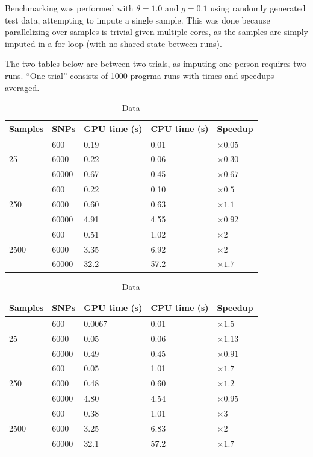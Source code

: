 \documentclass[12pt]{article}
\begin{document}
Benchmarking was performed with $\theta = 1.0$ and $g = 0.1$ using randomly
generated test data, attempting to impute a single sample. This was done
because parallelizing over samples is trivial given multiple cores, as the
samples are simply imputed in a for loop (with no shared state between runs).

The two tables below are between two trials, as imputing one
person requires two runs. ``One trial'' consists of 1000 progrma runs with
times and speedups averaged.



\begin{table}[ht]
  \caption{Data}
\begin{tabular}{l|lll|l}
Samples & SNPs  & GPU time (s) & CPU time (s) & Speedup       \\
        \hline
        & 600   & 0.19         & 0.01         & $\times 0.05$ \\
25      & 6000  & 0.22         & 0.06         & $\times 0.30$ \\
        & 60000 & 0.67         & 0.45         & $\times 0.67$ \\
        \hline
        & 600   & 0.22         & 0.10         & $\times 0.5$  \\
250     & 6000  & 0.60         & 0.63         & $\times 1.1$  \\
        & 60000 & 4.91         & 4.55         & $\times 0.92$ \\
        \hline
        & 600   & 0.51         & 1.02         & $\times 2$    \\
2500    & 6000  & 3.35         & 6.92         & $\times 2$    \\
        & 60000 & 32.2         & 57.2         & $\times 1.7$
\end{tabular}

\begin{tabular}{l|lll|l}
  Samples & SNPs & GPU time (s) & CPU time (s) & Speedup       \\
\hline
  & 600&0.0067       & 0.01         & $\times 1.5$  \\
  25 & 6000 &0.05         & 0.06         & $\times 1.13$ \\
  & 60000&0.49         & 0.45         & $\times 0.91$ \\
\hline
  & 600&0.05         & 1.01         & $\times 1.7$  \\
  250 & 6000&0.48         & 0.60         & $\times 1.2$  \\
  & 60000 &4.80         & 4.54         & $\times 0.95$ \\
\hline
  & 600&0.38         & 1.01         & $\times 3$    \\
  2500 &6000 &3.25         & 6.83         & $\times 2$    \\
  & 60000&32.1         & 57.2         & $\times 1.7$
\end{tabular}
\end{table}
\end{document}
